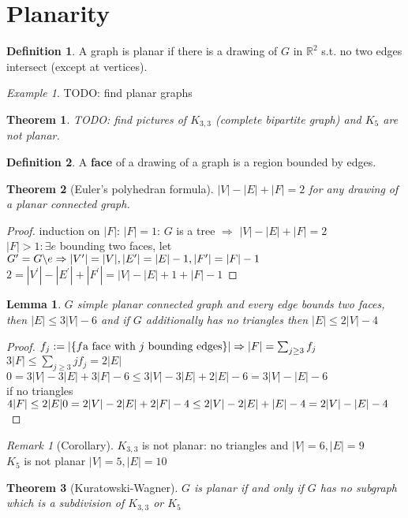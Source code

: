 \documentclass{article}
\newtheorem*{theorem}{Theorem}
\newtheorem*{lemma}{Lemma}
\theoremstyle{definition}
\newtheorem*{definition}{Definition}
\theoremstyle{remark}
\newtheorem*{remark}{Remark}
\newtheorem*{example}{Example}
\begin{document}
\section*{Planarity}
\begin{definition}
  A graph is planar if there is a drawing of $G$ in $\mathbb{R}^2$ s.t. no two edges intersect (except at vertices).
\end{definition}
\begin{example}
  TODO: find planar graphs
\end{example}
\begin{theorem}
  TODO: find pictures of $K_{3,3}$ (complete bipartite graph) and $K_5$ are not planar.
\end{theorem}
\begin{definition}
  A \textbf{face} of a drawing of a graph is a region bounded by edges.
\end{definition}
\begin{theorem}[Euler's polyhedran formula]
  $|V|-|E|+|F|= 2$ for any drawing of a planar connected graph.
\end{theorem}
\begin{proof}
  induction on $|F|$: $|F|= 1$: $G$ is a tree $\Rightarrow$  $|V| - |E| + |F| = 2$\\
  $|F| > 1: \exists e$ bounding two faces, let $G^\prime = G \backslash e\\ \Rightarrow |V^\prime| = |V|, |E^\prime| = |E| - 1,|F^\prime|=|F|-1$\\
  $2 = |V^\prime|-|E^\prime|+|F^\prime| = |V| - |E|+1 + |F|-1$
\end{proof}
\begin{lemma}
  $G$ simple planar connected graph and every edge bounds two faces, then $|E| \leq 3|V|-6$ and if $G$ additionally has no triangles then $|E|\leq 2|V|-4$
\end{lemma}
\begin{proof}
  $f_j:= |\{f \text{a face with $j$ bounding edges}\}|\\
  \Rightarrow |F| = \sum_{j\geq 3}f_j$ \\
  $3|F| \leq \sum_{j\geq 3}jf_j = 2|E|$\\
  $0 = 3|V|-3|E|+3|F|-6 \leq 3|V|-3|E|+2|E|-6=3|V|-|E|-6$\\
  if no triangles\\
  $4|F|\leq 2|E|\\
  0=2|V|-2|E|+2|F|-4 \leq 2|V|-2|E|+|E|-4=2|V|-|E|-4$
\end{proof}
\begin{remark}[Corollary]
  $K_{3,3}$ is not planar: no triangles and  $|V| = 6, |E|=9$\\
  $K_5$ is not planar $|V|=5, |E|=10$
\end{remark}
\begin{theorem}[Kuratowski-Wagner]
  $G$ is planar if and only if $G$ has no subgraph which is a subdivision of $K_{3,3}$ or $K_5$
\end{theorem}
\end{document}
